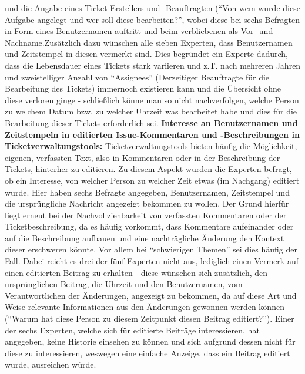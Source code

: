 und die Angabe eines Ticket-Erstellers und -Beauftragten (\enquote{Von wem wurde diese Aufgabe angelegt und wer soll diese bearbeiten?}, wobei diese bei sechs Befragten in Form eines Benutzernamen auftritt und beim verbliebenen als Vor- und Nachname.Zusätzlich dazu wünschen alle sieben Experten, dass Benutzernamen und Zeitstempel in diesen vermerkt sind. Dies begründet ein 
Experte dadurch, dass die Lebensdauer eines Tickets stark variieren und z.T. nach mehreren Jahren und zweistelliger Anzahl von \enquote{Assignees} (Derzeitiger Beauftragte für die Bearbeitung des Tickets) immernoch existieren kann und die Übersicht ohne diese verloren ginge - schließlich könne man so nicht nachverfolgen, welche Person zu welchem Datum bzw. zu welcher Uhrzeit 
was bearbeitet habe und dies für die Bearbeitung dieser Tickets erforderlich sei. \newline \newline
\textbf{Interesse an Benutzernamen und Zeitstempeln in editierten Issue-Kommentaren und -Beschreibungen in Ticketverwaltungstools:} \newline \label{comments}
Ticketverwaltungstools bieten häufig die Möglichkeit, eigenen, verfassten Text, also in Kommentaren oder in der Beschreibung der Tickets, hinterher zu editieren. Zu diesem Aspekt wurden die Experten befragt, ob ein Interesse, von welcher Person zu welcher Zeit etwas (im Nachgang) editiert wurde. Hier haben sechs Befragte angegeben, Benutzernamen, Zeitstempel und die ursprüngliche Nachricht
angezeigt bekommen zu wollen. Der Grund hierfür liegt erneut bei der Nachvollziehbarkeit von verfassten Kommentaren oder der Ticketbeschreibung, da es häufig vorkommt, dass Kommentare aufeinander oder auf die Beschreibung aufbauen und eine nachträgliche Änderung den Kontext dieser erschweren könnte. Vor allem bei \enquote{schwierigen Themen} sei dies häufig der Fall. Dabei reicht es drei der
fünf Experten nicht aus, lediglich einen Vermerk auf einen editierten Beitrag zu erhalten - diese wünschen sich zusätzlich, den ursprünglichen Beitrag, die Uhrzeit und den Benutzernamen, vom Verantwortlichen der Änderungen, angezeigt zu bekommen, da auf diese Art und Weise relevante Informationen aus den Änderungen gewonnen werden können (\enquote{Warum hat diese Person zu diesem Zeitpunkt diesen Beitrag
editiert?}). Einer der sechs Experten, welche sich für editierte Beiträge interessieren, hat angegeben, keine Historie einsehen zu können und sich aufgrund dessen nicht für diese zu interessieren, weswegen eine einfache Anzeige, dass ein Beitrag editiert wurde, ausreichen würde. \newline \newline
